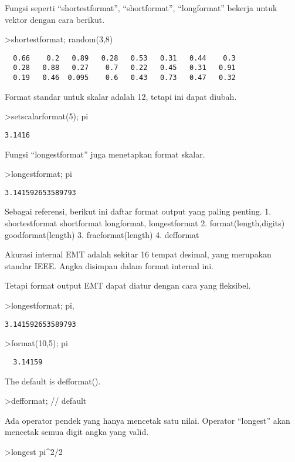 \documentclass[
]{book}
\begin{document}
Fungsi seperti ``shortestformat'', ``shortformat'', ``longformat'' bekerja untuk vektor dengan cara berikut.

\textgreater shortestformat; random(3,8)

\begin{verbatim}
  0.66    0.2   0.89   0.28   0.53   0.31   0.44    0.3 
  0.28   0.88   0.27    0.7   0.22   0.45   0.31   0.91 
  0.19   0.46  0.095    0.6   0.43   0.73   0.47   0.32 
\end{verbatim}

Format standar untuk skalar adalah 12, tetapi ini dapat diubah.

\textgreater setscalarformat(5); pi

\begin{verbatim}
3.1416
\end{verbatim}

Fungsi ``longestformat'' juga menetapkan format skalar.

\textgreater longestformat; pi

\begin{verbatim}
3.141592653589793
\end{verbatim}

Sebagai referensi, berikut ini daftar format output yang paling penting. 1. shortestformat shortformat longformat, longestformat 2. format(length,digits) goodformat(length) 3. fracformat(length) 4. defformat

Akurasi internal EMT adalah sekitar 16 tempat desimal, yang merupakan standar IEEE. Angka disimpan dalam format internal ini.

Tetapi format output EMT dapat diatur dengan cara yang fleksibel.

\textgreater longestformat; pi,

\begin{verbatim}
3.141592653589793
\end{verbatim}

\textgreater format(10,5); pi

\begin{verbatim}
  3.14159 
\end{verbatim}

The default is defformat().

\textgreater defformat; // default

Ada operator pendek yang hanya mencetak satu nilai. Operator ``longest'' akan mencetak semua digit angka yang valid.

\textgreater longest pi\^{}2/2
\end{document}
